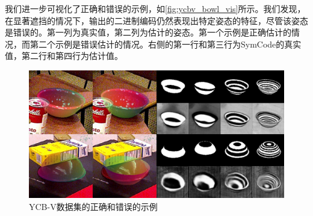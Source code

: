 我们进一步可视化了正确和错误的示例，如\autoref{fig:ycbv_bowl_vis}所示。我们发现，在显著遮挡的情况下，输出的二进制编码仍然表现出特定姿态的特征，尽管该姿态是错误的。第一列为真实值，第二列为估计的姿态。第一个示例是正确估计的情况，而第二个示例是错误估计的情况。右侧的第一行和第三行为SymCode的真实值，第二行和第四行为估计值。

\begin{figure}[ht]
        \centerline{\includegraphics[width=1.0\textwidth]{figure/symnet/ycbv_bowl_vis.jpg}}
        \caption{YCB-V数据集的正确和错误的示例}
        \label{fig:ycbv_bowl_vis}
\end{figure}



